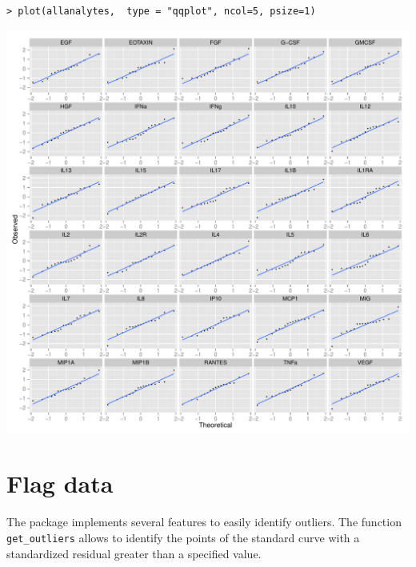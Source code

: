 \documentclass[11pt]{article}\usepackage[]{graphicx}\usepackage[]{color}
\makeatletter
\def\maxwidth{ %
  \ifdim\Gin@nat@width>\linewidth
    \linewidth
  \else
    \Gin@nat@width
  \fi
}
\newenvironment{kframe}{%
 \def\at@end@of@kframe{}%
 \ifinner\ifhmode%
  \def\at@end@of@kframe{\end{minipage}}%
  \begin{minipage}{\columnwidth}%
 \fi\fi%
 \def\FrameCommand##1{\hskip\@totalleftmargin \hskip-\fboxsep
 \colorbox{shadecolor}{##1}\hskip-\fboxsep
     \hskip-\linewidth \hskip-\@totalleftmargin \hskip\columnwidth}%
 \MakeFramed {\advance\hsize-\width
   \@totalleftmargin\z@ \linewidth\hsize
   \@setminipage}}%
 {\par\unskip\endMakeFramed%
 \at@end@of@kframe}
\newenvironment{knitrout}{}{} %
\makeatother
\begin{document}
\begin{knitrout}
\color{fgcolor}\begin{kframe}
\begin{verbatim}
> plot(allanalytes,  type = "qqplot", ncol=5, psize=1)
\end{verbatim}
\end{kframe}

{\centering \includegraphics[width=\maxwidth]{./unnamed-chunk-51-1} 

}



\end{knitrout}

\section{Flag data}

\noindent The package implements several features to easily identify outliers.
The function {\tt get\_outliers} allows to identify the points of the standard
curve with a standardized residual greater than a specified value.
\end{document}
